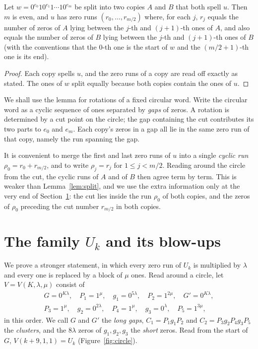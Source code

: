 \documentclass[12pt]{article}
\newcommand{\zz}[1]{0^{#1}}
\begin{document}
\begin{lemma}\label{lem:split}
Let $w = \zz{e_0}1\zz{e_1}1\cdots1\zz{e_m}$ be split into two copies $A$ and $B$ that both spell $u$. Then
$m$ is even, and $u$ has zero runs $(r_0,\dots,r_{m/2})$ where, for each $j$, $r_j$ equals the number of
zeros of $A$ lying between the $j$-th and $(j+1)$-th ones of $A$, and also equals the number of zeros of $B$
lying between the $j$-th and $(j+1)$-th ones of $B$ (with the conventions that the $0$-th one is the start of
$w$ and the $(m/2+1)$-th one is its end).
\end{lemma}

\begin{proof}
Each copy spells $u$, and the zero runs of a copy are read off exactly as stated. The ones of $w$ split
equally because both copies contain the ones of $u$.
\end{proof}

We shall use the lemma for rotations of a fixed circular word. Write the circular word as a cyclic sequence of
ones separated by \emph{gaps} of zeros. A rotation is determined by a cut point on the circle; the gap
containing the cut contributes its two parts to $e_0$ and $e_m$. Each copy's zeros in a gap all lie in the
same zero run of that copy, namely the run spanning the gap.

It is convenient to merge the first and last zero runs of $u$ into a single \emph{cyclic run} $\rho_0 = r_0 +
r_{m/2}$, and to write $\rho_j = r_j$ for $1 \le j < m/2$. Reading around the circle from the cut, the
cyclic runs of $A$ and of $B$ then agree term by term. This is weaker than Lemma~\ref{lem:split}, and we use
the extra information only at the very end of Section~\ref{sec:U}: the cut lies inside the run $\rho_0$ of
both copies, and the zeros of $\rho_0$ preceding the cut number $r_{m/2}$ in both copies.

\section{The family $U_k$ and its blow-ups}\label{sec:U}

We prove a stronger statement, in which every zero run of $U_k$ is multiplied by $\lambda$ and every one is
replaced by a block of $\mu$ ones. Read around a circle, let $V = V(K,\lambda,\mu)$ consist of
\begin{gather*}
G = \zz{K\lambda},\quad P_1 = 1^{\mu},\quad g_1 = \zz{5\lambda},\quad P_2 = 1^{2\mu},\quad G' = \zz{K\lambda},\\
P_3 = 1^{\mu},\quad g_2 = \zz{2\lambda},\quad P_4 = 1^{\mu},\quad g_3 = \zz{\lambda},\quad P_5 = 1^{3\mu},
\end{gather*}
in this order. We call $G$ and $G'$ the \emph{long gaps}, $C_1 = P_1 g_1 P_2$ and $C_2 = P_3 g_2 P_4 g_3 P_5$
the \emph{clusters}, and the $8\lambda$ zeros of $g_1, g_2, g_3$ the \emph{short} zeros. Read from the start
of $G$, $V(k+9,1,1) = U_k$ (Figure~\ref{fig:circle}).
\end{document}
